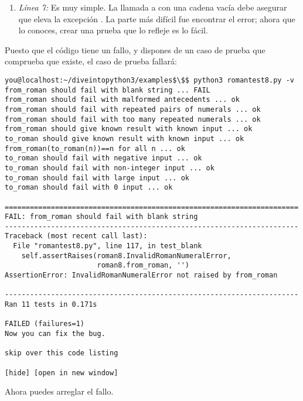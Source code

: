 \begin{enumerate}

\item \emph{Línea 7:} Es muy simple. La llamada a  con una cadena vacía debe asegurar que eleva la excepción . La parte más difícil fue encontrar el error; ahora que lo conoces, crear una prueba que lo refleje es lo fácil.

\end{enumerate}

Puesto que el código tiene un fallo, y dispones de un caso de prueba que comprueba que existe, el caso de prueba fallará:

\noindent\begin{minipage}{\textwidth}
\begin{lstlisting}[mathescape=True]
you@localhost:~/diveintopython3/examples$\$$ python3 romantest8.py -v
from_roman should fail with blank string ... FAIL
from_roman should fail with malformed antecedents ... ok
from_roman should fail with repeated pairs of numerals ... ok
from_roman should fail with too many repeated numerals ... ok
from_roman should give known result with known input ... ok
to_roman should give known result with known input ... ok
from_roman(to_roman(n))==n for all n ... ok
to_roman should fail with negative input ... ok
to_roman should fail with non-integer input ... ok
to_roman should fail with large input ... ok
to_roman should fail with 0 input ... ok

======================================================================
FAIL: from_roman should fail with blank string
----------------------------------------------------------------------
Traceback (most recent call last):
  File "romantest8.py", line 117, in test_blank
    self.assertRaises(roman8.InvalidRomanNumeralError,
                      roman8.from_roman, '')
AssertionError: InvalidRomanNumeralError not raised by from_roman

----------------------------------------------------------------------
Ran 11 tests in 0.171s

FAILED (failures=1)
Now you can fix the bug.

skip over this code listing

[hide] [open in new window]
\end{lstlisting}
\end{minipage}

Ahora puedes arreglar el fallo.

